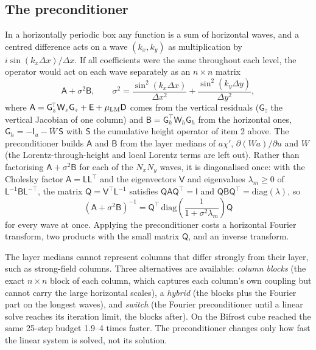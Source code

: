 \subsection{The preconditioner}
In a horizontally periodic box any function is a sum of horizontal waves, and a centred difference acts on a wave
$(k_x,k_y)$ as multiplication by $i\sin(k_x\Delta x)/\Delta x$. If all coefficients were the same throughout each level, the
operator would act on each wave separately as an $n\times n$ matrix
\begin{equation}
\mathsf A+\sigma^2\mathsf B,\qquad \sigma^2=\frac{\sin^2(k_x\Delta x)}{\Delta x^2}+\frac{\sin^2(k_y\Delta y)}{\Delta y^2},
\end{equation}
where $\mathsf A=\mathsf G_z^{\!\top}\mathsf W_z\mathsf G_z+\mathsf E+\mu_{\rm LM}\mathsf D$ comes from the vertical residuals
($\mathsf G_z$ the vertical Jacobian of one column) and $\mathsf B=\mathsf G_h^{\!\top}\mathsf W_h\mathsf G_h$ from the horizontal
ones, $\mathsf G_h=-\mathsf I_u-\overline W\,\mathsf S$ with $\mathsf S$ the cumulative height operator of item 2 above. The
preconditioner builds $\mathsf A$ and $\mathsf B$ from the layer medians of $a\chi'$, $\partial(Wa)/\partial u$ and $W$ (the
Lorentz-through-height and local Lorentz terms are left out). Rather than factorising $\mathsf A+\sigma^2\mathsf B$ for each of
the $N_xN_y$ waves, it is diagonalised once: with the Cholesky factor $\mathsf A=\mathsf L\mathsf L^{\!\top}$ and the eigenvectors
$\mathsf V$ and eigenvalues $\lambda_m\ge0$ of $\mathsf L^{-1}\mathsf B\mathsf L^{-\top}$, the matrix
$\mathsf Q=\mathsf V^{\!\top}\mathsf L^{-1}$ satisfies $\mathsf Q\mathsf A\mathsf Q^{\!\top}=\mathsf I$ and $\mathsf Q\mathsf
B\mathsf Q^{\!\top}=\mathrm{diag}(\lambda)$, so
\begin{equation}
(\mathsf A+\sigma^2\mathsf B)^{-1}=\mathsf Q^{\!\top}\,\mathrm{diag}\!\left(\frac{1}{1+\sigma^2\lambda_m}\right)\mathsf Q
\end{equation}
for every wave at once. Applying the preconditioner costs a horizontal Fourier transform, two products with the small matrix
$\mathsf Q$, and an inverse transform.

The layer medians cannot represent columns that differ strongly from their layer, such as strong-field columns. Three alternatives
are available: \emph{column blocks} (the exact $n\times n$ block of each column, which captures each column's own coupling but
cannot carry the large horizontal scales), a \emph{hybrid} (the blocks plus the Fourier part on the longest waves), and
\emph{switch} (the Fourier preconditioner until a linear solve reaches its iteration limit, the blocks after). On the Bifrost cube
 reached the same 25-step budget 1.9--4 times faster. The preconditioner changes only how fast the linear system is
solved, not its solution.

